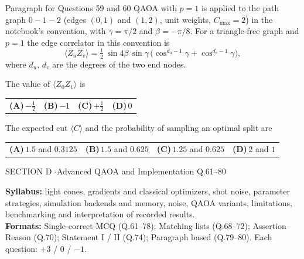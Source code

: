 \documentclass[11pt,a4paper]{article}
\newcommand{\optlabel}[1]{\textbf{(#1)}}
\newenvironment{qitem}[1]{\begin{list}{}{\setlength{\leftmargin}{3.3em}\setlength{\labelwidth}{3.1em}%
  \setlength{\labelsep}{0.2em}\setlength{\topsep}{3pt}\setlength{\parsep}{3pt}}\item[\textbf{Q.#1}\hfill]}{\end{list}}
\newcommand{\qsep}{\par\vspace{2pt}{\color{black!15}\hrule}\vspace{4pt}}
\begin{document}
\begin{passagebox}{Paragraph for Questions 59 and 60}
QAOA with $p = 1$ is applied to the path graph $0 - 1 - 2$ (edges $(0,1)$ and $(1,2)$, unit weights,
$C_{\max} = 2$) in the notebook's convention, with $\gamma = \pi/2$ and $\beta = -\pi/8$. For a triangle-free graph and $p = 1$
the edge correlator in this convention is
\[ \langle Z_uZ_v\rangle = \tfrac12\,\sin4\beta\,\sin\gamma\,\big(\cos^{d_u - 1}\gamma + \cos^{d_v - 1}\gamma\big), \]
where $d_u$, $d_v$ are the degrees of the two end nodes.
\end{passagebox}
\begin{qitem}{59}
The value of $\langle Z_0Z_1\rangle$ is
\par\smallskip\noindent\begin{tabularx}{\linewidth}{@{}*{4}{L}@{}}
\optlabel{A}\,$-\tfrac12$ & \optlabel{B}\,$-1$ & \optlabel{C}\,$+\tfrac12$ & \optlabel{D}\,$0$
\end{tabularx}
\end{qitem}
\qsep

\begin{qitem}{60}
The expected cut $\langle C\rangle$ and the probability of sampling an optimal split are
\par\smallskip\noindent\begin{tabularx}{\linewidth}{@{}*{4}{L}@{}}
\optlabel{A}\,$1.5$ and $0.3125$ & \optlabel{B}\,$1.5$ and $0.625$ & \optlabel{C}\,$1.25$ and $0.625$ & \optlabel{D}\,$2$ and $1$
\end{tabularx}
\end{qitem}
\qsep

\newpage

\begin{sectionbanner}SECTION D \enspace$\cdot$\enspace Advanced QAOA and Implementation \hfill Q.61--80\end{sectionbanner}

{\small \textbf{Syllabus:} light cones, gradients and classical optimizers, shot noise, parameter strategies, simulation backends and memory, noise, QAOA variants, limitations, benchmarking and interpretation of recorded results.\\ \textbf{Formats:} Single-correct MCQ (Q.61--78); Matching lists (Q.68--72); Assertion--Reason (Q.70); Statement I / II (Q.74); Paragraph based (Q.79--80). Each question: $+3$ / $0$ / $-1$.}
\par\medskip
\end{document}
